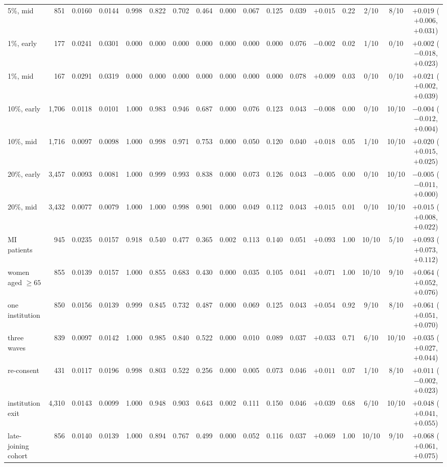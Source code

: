 \begin{table}[t]
{\begin{tabular}{@{}l r c c ccc c ccc c ccc c c@{}}
5\%, mid & 851 & 0.0160 & 0.0144 & 0.998 & 0.822 & 0.702 & 0.464 & 0.000 & 0.067 & 0.125 & 0.039 & $+0.015$ & 0.22 & 2/10 & 8/10 & $+0.019$ ($+0.006$, $+0.031$) \\
1\%, early & 177 & 0.0241 & 0.0301 & 0.000 & 0.000 & 0.000 & 0.000 & 0.000 & 0.000 & 0.000 & 0.076 & $-0.002$ & 0.02 & 1/10 & 0/10 & $+0.002$ ($-0.018$, $+0.023$) \\
1\%, mid & 167 & 0.0291 & 0.0319 & 0.000 & 0.000 & 0.000 & 0.000 & 0.000 & 0.000 & 0.000 & 0.078 & $+0.009$ & 0.03 & 0/10 & 0/10 & $+0.021$ ($+0.002$, $+0.039$) \\
10\%, early & 1{,}706 & 0.0118 & 0.0101 & 1.000 & 0.983 & 0.946 & 0.687 & 0.000 & 0.076 & 0.123 & 0.043 & $-0.008$ & 0.00 & 0/10 & 10/10 & $-0.004$ ($-0.012$, $+0.004$) \\
10\%, mid & 1{,}716 & 0.0097 & 0.0098 & 1.000 & 0.998 & 0.971 & 0.753 & 0.000 & 0.050 & 0.120 & 0.040 & $+0.018$ & 0.05 & 1/10 & 10/10 & $+0.020$ ($+0.015$, $+0.025$) \\
20\%, early & 3{,}457 & 0.0093 & 0.0081 & 1.000 & 0.999 & 0.993 & 0.838 & 0.000 & 0.073 & 0.126 & 0.043 & $-0.005$ & 0.00 & 0/10 & 10/10 & $-0.005$ ($-0.011$, $+0.000$) \\
20\%, mid & 3{,}432 & 0.0077 & 0.0079 & 1.000 & 1.000 & 0.998 & 0.901 & 0.000 & 0.049 & 0.112 & 0.043 & $+0.015$ & 0.01 & 0/10 & 10/10 & $+0.015$ ($+0.008$, $+0.022$) \\
MI patients & 945 & 0.0235 & 0.0157 & 0.918 & 0.540 & 0.477 & 0.365 & 0.002 & 0.113 & 0.140 & 0.051 & $+0.093$ & 1.00 & 10/10 & 5/10 & $+0.093$ ($+0.073$, $+0.112$) \\
women aged $\ge65$ & 855 & 0.0139 & 0.0157 & 1.000 & 0.855 & 0.683 & 0.430 & 0.000 & 0.035 & 0.105 & 0.041 & $+0.071$ & 1.00 & 10/10 & 9/10 & $+0.064$ ($+0.052$, $+0.076$) \\
one institution & 850 & 0.0156 & 0.0139 & 0.999 & 0.845 & 0.732 & 0.487 & 0.000 & 0.069 & 0.125 & 0.043 & $+0.054$ & 0.92 & 9/10 & 8/10 & $+0.061$ ($+0.051$, $+0.070$) \\
three waves & 839 & 0.0097 & 0.0142 & 1.000 & 0.985 & 0.840 & 0.522 & 0.000 & 0.010 & 0.089 & 0.037 & $+0.033$ & 0.71 & 6/10 & 10/10 & $+0.035$ ($+0.027$, $+0.044$) \\
re-consent & 431 & 0.0117 & 0.0196 & 0.998 & 0.803 & 0.522 & 0.256 & 0.000 & 0.005 & 0.073 & 0.046 & $+0.011$ & 0.07 & 1/10 & 8/10 & $+0.011$ ($-0.002$, $+0.023$) \\
institution exit & 4{,}310 & 0.0143 & 0.0099 & 1.000 & 0.948 & 0.903 & 0.643 & 0.002 & 0.111 & 0.150 & 0.046 & $+0.039$ & 0.68 & 6/10 & 10/10 & $+0.048$ ($+0.041$, $+0.055$) \\
late-joining cohort & 856 & 0.0140 & 0.0139 & 1.000 & 0.894 & 0.767 & 0.499 & 0.000 & 0.052 & 0.116 & 0.037 & $+0.069$ & 1.00 & 10/10 & 9/10 & $+0.068$ ($+0.061$, $+0.075$) \\
\bottomrule
\end{tabular}}
\end{table}
